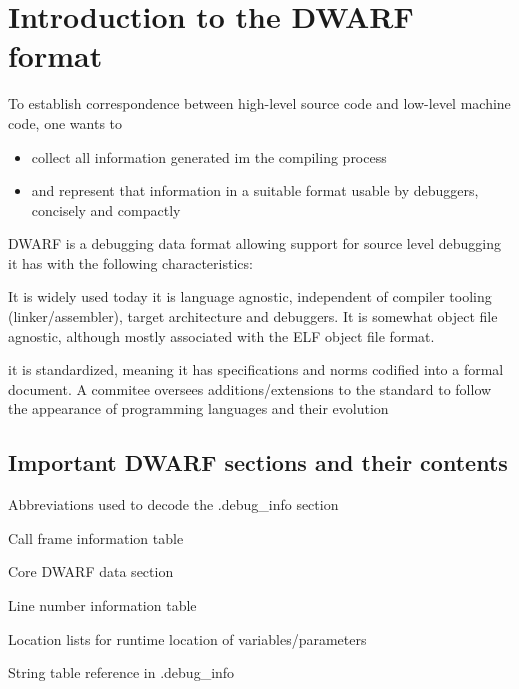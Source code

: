 \chapter{Introduction to the DWARF format\label{cha:chapter2}}

To establish correspondence between high-level source code and low-level machine code, one wants to
\begin{itemize}
    \item  collect all information generated im the compiling process
    \item  and represent that information in a suitable format usable by debuggers, concisely and compactly
\end{itemize}

DWARF is a debugging data format allowing support for source level debugging
it has with the following characteristics:

It is widely used today
it is language agnostic, independent of compiler tooling (linker/assembler),
target architecture and debuggers.
It is somewhat object file agnostic, although mostly associated with the ELF object file format.

it is standardized, meaning it has specifications and norms codified into
a formal document.
A commitee oversees additions/extensions to the standard to follow the
appearance of programming languages and their evolution

\section{Important DWARF sections and their contents}

\begin{description}[labelwidth=\widthof{\bfseries .debug\_abbrev},align=parright]
    \item[.debug\_abbrev] Abbreviations used to decode the .debug\_info section
    \item[.debug\_frame] Call frame information table
    \item[.debug\_info] Core DWARF data section
    \item[.debug\_line] Line number information table
    \item[.debug\_loc] Location lists for runtime location of variables/parameters
    \item[.debug\_str] String table reference in .debug\_info
\end{description}

